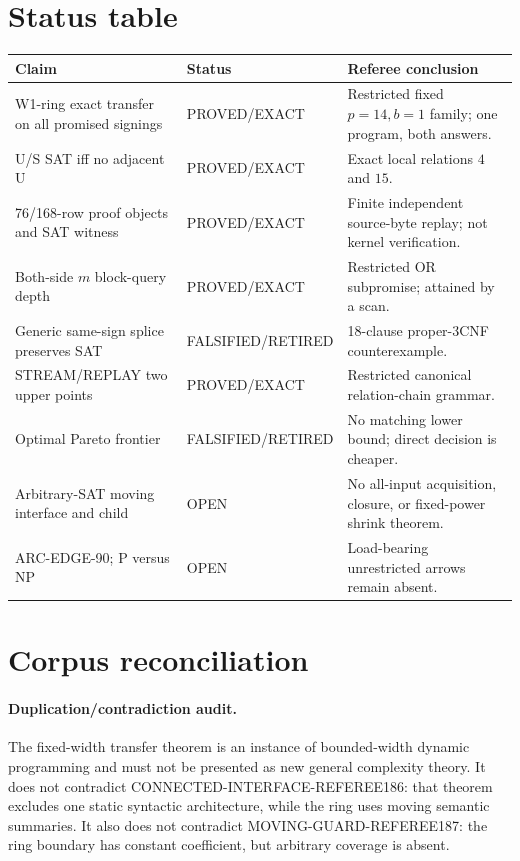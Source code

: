 \documentclass[11pt]{article}
\begin{document}
\section{Status table}
\begin{center}\small
\begin{tabular}{p{.35\linewidth}p{.18\linewidth}p{.36\linewidth}}
\toprule
Claim & Status & Referee conclusion\\\midrule
W1-ring exact transfer on all promised signings &
PROVED/EXACT & Restricted fixed $p=14,b=1$ family; one program, both answers.\\
U/S SAT iff no adjacent U &
PROVED/EXACT & Exact local relations $4$ and $15$.\\
76/168-row proof objects and SAT witness &
PROVED/EXACT & Finite independent source-byte replay; not kernel verification.\\
Both-side $m$ block-query depth &
PROVED/EXACT & Restricted OR subpromise; attained by a scan.\\
Generic same-sign splice preserves SAT &
FALSIFIED/RETIRED & 18-clause proper-3CNF counterexample.\\
STREAM/REPLAY two upper points &
PROVED/EXACT & Restricted canonical relation-chain grammar.\\
Optimal Pareto frontier &
FALSIFIED/RETIRED & No matching lower bound; direct decision is cheaper.\\
Arbitrary-SAT moving interface and child &
OPEN & No all-input acquisition, closure, or fixed-power shrink theorem.\\
ARC-EDGE-90; P versus NP &
OPEN & Load-bearing unrestricted arrows remain absent.\\\bottomrule
\end{tabular}
\end{center}

\section{Corpus reconciliation}
\paragraph{Duplication/contradiction audit.}
The fixed-width transfer theorem is an instance of bounded-width dynamic
programming and must not be presented as new general complexity theory. It
does not contradict CONNECTED-INTERFACE-REFEREE186: that theorem excludes one
static syntactic architecture, while the ring uses moving semantic summaries.
It also does not contradict MOVING-GUARD-REFEREE187: the ring boundary has
constant coefficient, but arbitrary coverage is absent.
\end{document}
